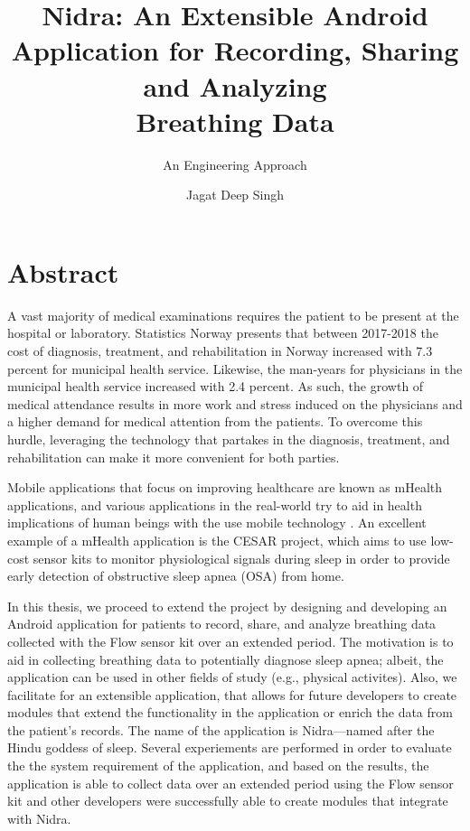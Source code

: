 \documentclass[UKenglish]{ifimaster}  %
\title{Nidra: An Extensible Android Application for Recording, Sharing and Analyzing \\ Breathing Data}
\subtitle{An Engineering Approach}
\author{Jagat Deep Singh}
\begin{document}
\duoforside[dept={Department of Informatics},   %
  program={Programming and Networks},  %
  long]                                        %

\frontmatter{}
\chapter*{Abstract}
 A vast majority of medical examinations requires the patient to be present at the hospital or laboratory. Statistics Norway \cite{ssb} presents that between 2017-2018 the cost of diagnosis, treatment, and rehabilitation in Norway increased with 7.3 percent for municipal health service. Likewise, the man-years for physicians in the municipal health service increased with 2.4 percent. As such, the growth of medical attendance results in more work and stress induced on the physicians and a higher demand for medical attention from the patients. To overcome this hurdle, leveraging the technology that partakes in the diagnosis, treatment, and rehabilitation can make it more convenient for both parties. 
 
 Mobile applications that focus on improving healthcare are known as mHealth applications, and various applications in the real-world try to aid in health implications of human beings with the use mobile technology \cite{contactless_sleep, sam, mobilesleeplab}. An excellent example of a mHealth application is the CESAR project, which aims to use low-cost sensor kits to monitor physiological signals during sleep in order to provide early detection of obstructive sleep apnea (OSA) \cite{cesar} from home. 
 
 In this thesis, we proceed to extend the project by designing and developing an Android application for patients to record, share, and analyze breathing data collected with the Flow sensor kit over an extended period. The motivation is to aid in collecting breathing data to potentially diagnose sleep apnea; albeit, the application can be used in other fields of study (e.g., physical activites). Also, we facilitate for an extensible application, that allows for future developers to create modules that extend the functionality in the application or enrich the data from the patient's records. The name of the application is Nidra---named after the Hindu goddess of sleep. Several experiements are performed in order to evaluate the the system requirement of the application, and based on the results, the application is able to collect data over an extended period using the Flow sensor kit and other developers were successfully able to create modules that integrate with Nidra.  
\end{document}

